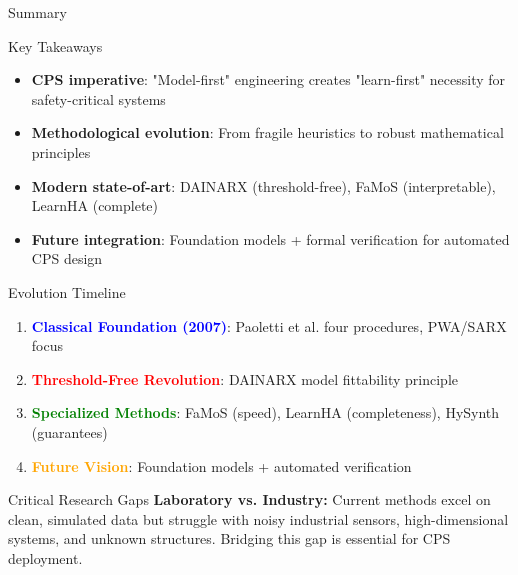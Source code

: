 \documentclass[aspectratio=169]{beamer}
\begin{document}
\begin{frame}{Summary}
\begin{block}{Key Takeaways}
\begin{itemize}
\item \textbf{CPS imperative}: "Model-first" engineering creates "learn-first" necessity for safety-critical systems
\item \textbf{Methodological evolution}: From fragile heuristics to robust mathematical principles
\item \textbf{Modern state-of-art}: DAINARX (threshold-free), FaMoS (interpretable), LearnHA (complete)
\item \textbf{Future integration}: Foundation models + formal verification for automated CPS design
\end{itemize}
\end{block}

\begin{block}{Evolution Timeline}
\begin{enumerate}
\item \textcolor{blue}{\textbf{Classical Foundation (2007)}}: Paoletti et al. four procedures, PWA/SARX focus
\item \textcolor{red}{\textbf{Threshold-Free Revolution}}: DAINARX model fittability principle
\item \textcolor{green}{\textbf{Specialized Methods}}: FaMoS (speed), LearnHA (completeness), HySynth (guarantees)
\item \textcolor{orange}{\textbf{Future Vision}}: Foundation models + automated verification
\end{enumerate}
\end{block}

\begin{exampleblock}{Critical Research Gaps}
\textbf{Laboratory vs. Industry:} Current methods excel on clean, simulated data but struggle with noisy industrial sensors, high-dimensional systems, and unknown structures. Bridging this gap is essential for CPS deployment.
\end{exampleblock}
\end{frame}
\end{document}
